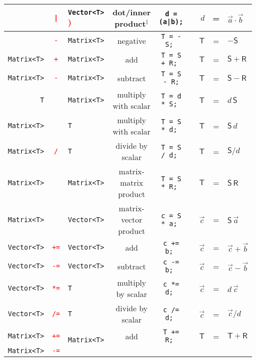 \documentclass[12pt,twoside]{article}
\begin{document}
\begin{table}[t]
\begin{center}
\begin{tabular}{|rcl|c|c|rcl|}
&\textcolor{red}{\texttt |}
& \texttt{Vector<T>} \textcolor{red})
& dot/inner product$^\ddagger$
& \tt d = (a|b); 
& $\quad d$&=&$\vec a \cdot \vec b$\\
%
\hline
%
&\texttt{\textcolor{red}-}
&\texttt{Matrix<T>}  
& negative 
& \tt T = -S; 
& $\quad \mathsf T$&=&$-\mathsf S$\\
%
\texttt{Matrix<T>}
&\textcolor{red}{\texttt +}
&\texttt{Matrix<T>} 
& add 
& \tt T = S + R; 
& $\quad \mathsf T$&=&$\mathsf S +\mathsf R$\\
%
\texttt{Matrix<T>}
&\textcolor{red}{\texttt -}
&\texttt{Matrix<T>} 
& subtract
& \tt T = S - R;
& $\quad \mathsf T$&=&$\mathsf S -\mathsf R$\\
%
\texttt{T}
&\textcolor{red}{\texttt *}
&\texttt{Matrix<T>} 
& multiply with scalar 
& \tt T = d * S; 
& $\quad \mathsf T$&=&$d\,\mathsf S$\\
%
\texttt{Matrix<T>} 
&\textcolor{red}{\texttt *} 
&\texttt{T} 
& multiply with scalar 
& \tt T = S * d; 
& $\quad \mathsf T$&=&$\mathsf S\, d$\\
%
\texttt{Matrix<T>} 
&\textcolor{red}{\texttt /} 
&\texttt{T} 
& divide by scalar 
& \tt T = S / d; 
& $\quad \mathsf T$&=&$\mathsf S / d$\\
%
\texttt{Matrix<T>}
&\textcolor{red}{\texttt *}
&\texttt{Matrix<T>} 
& matrix-matrix product
& \tt T = S * R; 
& $\quad \mathsf T$&=&$\mathsf S\,\mathsf R$\\
%
\texttt{Matrix<T>}
&\textcolor{red}{\texttt *} 
&\texttt{Vector<T>} 
& matrix-vector product
& \tt c = S * a; 
& $\quad \vec c$&=&$\mathsf S \, \vec a$\\
%
\hline
%
\texttt{Vector<T>}
&\textcolor{red}{\texttt{+=}}
&\texttt{Vector<T>} 
& add 
& \tt c += b; 
& $\quad \vec c$&=&$\vec c +\vec b$\\
%
 \texttt{Vector<T>}
&\texttt{\textcolor{red}{-=}}
&\texttt{Vector<T>} 
& subtract 
& \tt c -= b; 
& $\quad \vec c$&=&$\vec c -\vec b$\\
%
\texttt{Vector<T>}
&\texttt{\textcolor{red}{*=}}
&\texttt{T} 
& multiply by scalar
& \tt c *= d; 
& $\quad \vec c$&=&$d\,\vec c$\\
%
\texttt{Vector<T>}
&\texttt{\textcolor{red}{/=}}
&\texttt{T} 
& divide by scalar
& \tt c /= d; 
& $\quad \vec c$&=&$\vec c/d$\\
%
\texttt{Matrix<T>}
&\texttt{\textcolor{red}{+=}}
&\texttt{ Matrix<T>} 
& add 
& \tt T += R; 
& $\quad \mathsf T$&=&$\mathsf T +\mathsf R$\\
%
 \texttt{Matrix<T>}
&\texttt{\textcolor{red}{-=}}

\end{tabular}
\end{center}
\end{table}
\end{document}
